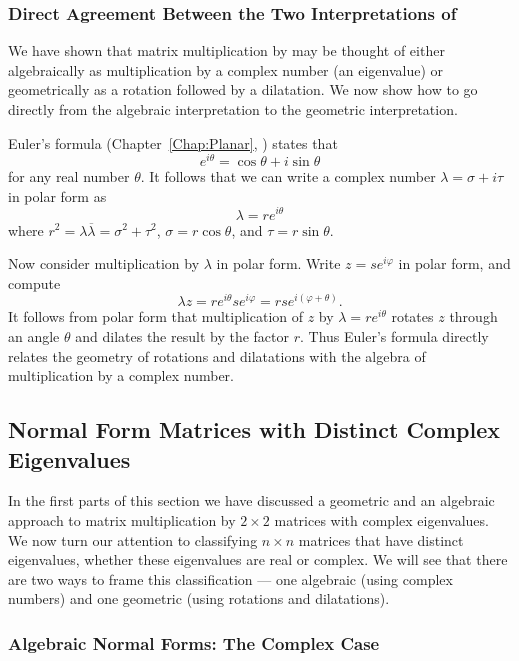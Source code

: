 \documentclass{ximera}
\begin{document}
\subsubsection*{Direct Agreement Between the Two Interpretations of 
\protect{}}   

We have shown that matrix multiplication by  may be thought 
of either algebraically as multiplication by a complex number (an eigenvalue)
or geometrically as a rotation followed by a dilatation.  We now show how to
go directly from the algebraic interpretation to the geometric interpretation.

Euler's formula (Chapter~\ref{Chap:Planar}, 
) states that
\[
e^{i\theta} = \cos\theta + i\sin\theta
\]
for any real number $\theta$. It follows that we can write a 
complex number $\lambda=\sigma+i\tau$ in polar form as
\[
\lambda = re^{i\theta}
\]
where $r^2=\lambda\overline{\lambda}=\sigma^2+\tau^2$, $\sigma=r\cos\theta$,
and $\tau=r\sin\theta$.  

Now consider multiplication by $\lambda$ in polar form.  Write 
$z=se^{i\varphi}$ in polar form, and compute
\[
\lambda z = re^{i\theta}se^{i\varphi} = rse^{i(\varphi+\theta)}.
\]
It follows from polar form that multiplication of $z$ by 
$\lambda=re^{i\theta}$  rotates 
$z$ through an angle $\theta$ and dilates the result by the factor $r$.
Thus Euler's formula directly relates the geometry of 
rotations and 
dilatations with the 
algebra of multiplication by a complex number.


\subsection*{Normal Form Matrices with Distinct Complex Eigenvalues}

In the first parts of this section we have discussed a geometric and 
an algebraic approach to matrix multiplication by $2\times 2$ matrices with 
complex eigenvalues.   We now turn our attention to classifying $n\times n$ 
matrices that have distinct eigenvalues, whether these eigenvalues are real 
or complex.  We will see that there are two ways to frame this classification 
--- one algebraic (using complex numbers) and one geometric (using rotations 
and dilatations).

\subsubsection*{Algebraic Normal Forms: The Complex Case}
\end{document}
